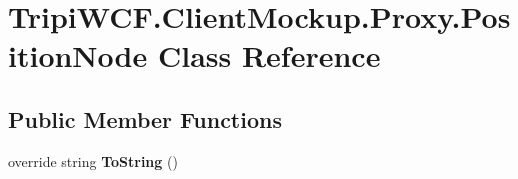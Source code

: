 \hypertarget{class_tripi_w_c_f_1_1_client_mockup_1_1_proxy_1_1_position_node}{
\section{TripiWCF.ClientMockup.Proxy.PositionNode Class Reference}
\label{class_tripi_w_c_f_1_1_client_mockup_1_1_proxy_1_1_position_node}
}
\subsection*{Public Member Functions}
\begin{DoxyCompactItemize}
\item 
\hypertarget{class_tripi_w_c_f_1_1_client_mockup_1_1_proxy_1_1_position_node_af70761d5eb200ce0f58498a748e180df}{
override string {\bfseries ToString} ()}
\label{class_tripi_w_c_f_1_1_client_mockup_1_1_proxy_1_1_position_node_af70761d5eb200ce0f58498a748e180df}

\end{DoxyCompactItemize}
